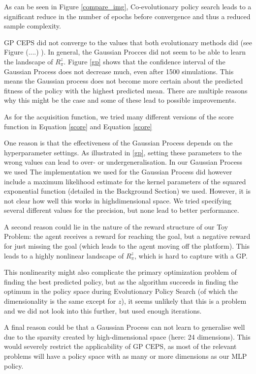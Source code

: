 As can be seen in Figure \ref{compare_img}, Co-evolutionary policy search leads to a significant reduce in the number of epochs before convergence and thus a reduced sample complexity. 

GP CEPS did not converge to the values that both evolutionary methods did (see Figure (....) ). In general, the Gaussian Procces did not seem to be able to learn the landscape of $R_{\pi}^z$. Figure \ref{gp} shows that the confidence interval of the Gaussian Process does not decrease much, even after 1500 simulations. This means the Gaussian process does not become more certain about the predicted fitness of the policy with the highest predicted mean.
There are multiple reasons why this might be the case and some of these lead to possible improvements. 

As for the acquisition function, we tried many different versions of the score function in Equation \ref{score} and Equation \ref{score} 

One reason is that the effectiveness of the Gaussian Process depends on the hyperparameter settings. As illustrated in \ref{gp}, setting these parameters to the wrong values can lead to over- or undergeneralisation. In our Gaussian Process we used  The implementation we used for the Gaussian Process did however include a maximum likelihood estimate for the kernel parameters of the squared exponential function (detailed in the Background Section) we used. However, it is not clear how well this works in highdimensional space. We tried specifying several different values for the precision, but none lead to better performance. 

A second reason could lie in the nature of the reward   structure of our Toy Problem: the agent receives a reward for reaching the goal, but a negative reward for just missing the goal (which leads to the agent moving off the platform). This leads to a highly nonlinear landscape of $R_{\pi}^z$, which is hard to capture with a GP. 

This nonlinearity might also complicate the primary optimization problem of finding the best predicted policy, but as the algorithm succeeds in finding the optimum in the policy space during Evolutionary Policy Search (of which the dimensionality is the same except for $z$), it seems unlikely that this is a problem and we did not look into this further, but used enough iterations.

A final reason could be that a Gaussian Process can not learn to generalise well due to the sparsity created by high-dimensional space (here: 24 dimensions). This would severely restrict the applicability of GP CEPS, as most of the relevant problems will have a policy space with as many or more dimensions as our MLP policy.

